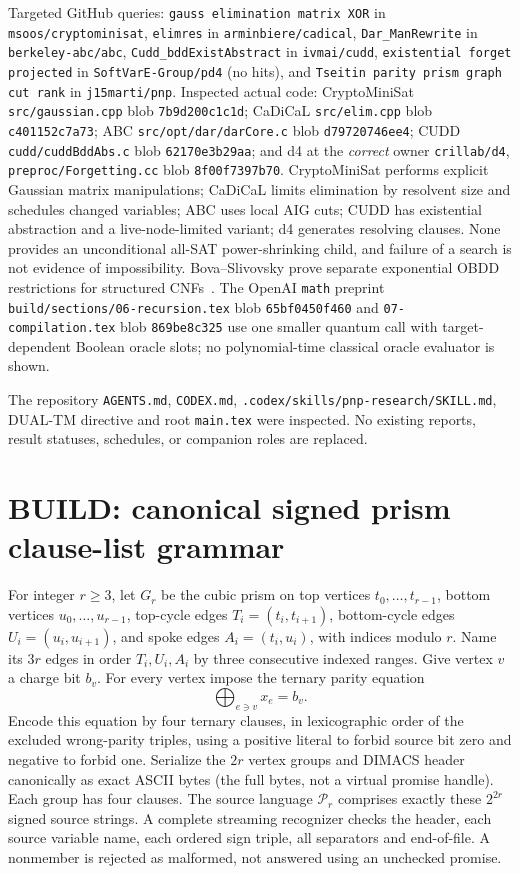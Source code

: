 \documentclass[11pt]{article}
\begin{document}
Targeted GitHub queries: \texttt{gauss elimination matrix XOR} in \texttt{msoos/cryptominisat}, \texttt{elimres} in \texttt{arminbiere/cadical}, \texttt{Dar\_ManRewrite} in \texttt{berkeley-abc/abc}, \texttt{Cudd\_bddExistAbstract} in \texttt{ivmai/cudd}, \texttt{existential forget projected} in \texttt{SoftVarE-Group/pd4} (no hits), and \texttt{Tseitin parity prism graph cut rank} in \texttt{j15marti/pnp}. Inspected actual code: CryptoMiniSat \texttt{src/gaussian.cpp} blob \texttt{7b9d200c1c1d}; CaDiCaL \texttt{src/elim.cpp} blob \texttt{c401152c7a73}; ABC \texttt{src/opt/dar/darCore.c} blob \texttt{d79720746ee4}; CUDD \texttt{cudd/cuddBddAbs.c} blob \texttt{62170e3b29aa}; and d4 at the \emph{correct} owner \texttt{crillab/d4}, \texttt{preproc/Forgetting.cc} blob \texttt{8f00f7397b70}. CryptoMiniSat performs explicit Gaussian matrix manipulations; CaDiCaL limits elimination by resolvent size and schedules changed variables; ABC uses local AIG cuts; CUDD has existential abstraction and a live-node-limited variant; d4 generates resolving clauses. None provides an unconditional all-SAT power-shrinking child, and failure of a search is not evidence of impossibility. Bova--Slivovsky prove separate exponential OBDD restrictions for structured CNFs~\cite{bova}. The OpenAI \texttt{math} preprint \texttt{build/sections/06-recursion.tex} blob \texttt{65bf0450f460} and \texttt{07-compilation.tex} blob \texttt{869be8c325} use one smaller quantum call with target-dependent Boolean oracle slots; no polynomial-time classical oracle evaluator is shown.

The repository \texttt{AGENTS.md}, \texttt{CODEX.md}, \texttt{.codex/skills/pnp-research/SKILL.md}, DUAL-TM directive and root \texttt{main.tex} were inspected. No existing reports, result statuses, schedules, or companion roles are replaced.

\section{BUILD: canonical signed prism clause-list grammar}
For integer $r\ge3$, let $G_r$ be the cubic prism on top vertices $t_0,\ldots,t_{r-1}$, bottom vertices $u_0,\ldots,u_{r-1}$, top-cycle edges $T_i=(t_i,t_{i+1})$, bottom-cycle edges $U_i=(u_i,u_{i+1})$, and spoke edges $A_i=(t_i,u_i)$, with indices modulo $r$. Name its $3r$ edges in order $T_i,U_i,A_i$ by three consecutive indexed ranges. Give vertex $v$ a charge bit $b_v$. For every vertex impose the ternary parity equation
\[
  \bigoplus_{e\ni v}x_e=b_v.
\]
Encode this equation by four ternary clauses, in lexicographic order of the excluded wrong-parity triples, using a positive literal to forbid source bit zero and negative to forbid one. Serialize the $2r$ vertex groups and DIMACS header canonically as exact ASCII bytes (the full bytes, not a virtual promise handle). Each group has four clauses. The source language $\mathcal P_r$ comprises exactly these $2^{2r}$ signed source strings. A complete streaming recognizer checks the header, each source variable name, each ordered sign triple, all separators and end-of-file. A nonmember is rejected as malformed, not answered using an unchecked promise.
\end{document}
